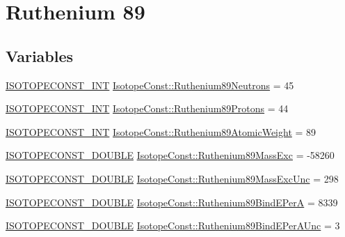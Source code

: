\hypertarget{group___isotope_const-_ruthenium-_ru89}{}\section{Ruthenium 89}
\label{group___isotope_const-_ruthenium-_ru89}
\subsection*{Variables}
\begin{DoxyCompactItemize}
\item 
\mbox{\hyperlink{group___isotope_const-_macros_ga5f18360b3e99483a35c32d789e62621c}{I\+S\+O\+T\+O\+P\+E\+C\+O\+N\+S\+T\+\_\+\+I\+NT}} \mbox{\hyperlink{group___isotope_const-_ruthenium-_ru89_ga52a7685e8abb6c1b7d7dfacb1fcd1abc}{Isotope\+Const\+::\+Ruthenium89\+Neutrons}} = 45
\item 
\mbox{\hyperlink{group___isotope_const-_macros_ga5f18360b3e99483a35c32d789e62621c}{I\+S\+O\+T\+O\+P\+E\+C\+O\+N\+S\+T\+\_\+\+I\+NT}} \mbox{\hyperlink{group___isotope_const-_ruthenium-_ru89_gaef5ae25256e875dc4ad3ab60cf710efb}{Isotope\+Const\+::\+Ruthenium89\+Protons}} = 44
\item 
\mbox{\hyperlink{group___isotope_const-_macros_ga5f18360b3e99483a35c32d789e62621c}{I\+S\+O\+T\+O\+P\+E\+C\+O\+N\+S\+T\+\_\+\+I\+NT}} \mbox{\hyperlink{group___isotope_const-_ruthenium-_ru89_gad777b961c2061da26df13c1b0f1cac62}{Isotope\+Const\+::\+Ruthenium89\+Atomic\+Weight}} = 89
\item 
\mbox{\hyperlink{group___isotope_const-_macros_ga8f45a7272ce02c0b4c65c44636ed719a}{I\+S\+O\+T\+O\+P\+E\+C\+O\+N\+S\+T\+\_\+\+D\+O\+U\+B\+LE}} \mbox{\hyperlink{group___isotope_const-_ruthenium-_ru89_ga822f599610e9cb2a6e105e4e0cd92e9e}{Isotope\+Const\+::\+Ruthenium89\+Mass\+Exc}} = -\/58260
\item 
\mbox{\hyperlink{group___isotope_const-_macros_ga8f45a7272ce02c0b4c65c44636ed719a}{I\+S\+O\+T\+O\+P\+E\+C\+O\+N\+S\+T\+\_\+\+D\+O\+U\+B\+LE}} \mbox{\hyperlink{group___isotope_const-_ruthenium-_ru89_ga6fbb70c9004f531d92b45e7b4c3d4de8}{Isotope\+Const\+::\+Ruthenium89\+Mass\+Exc\+Unc}} = 298
\item 
\mbox{\hyperlink{group___isotope_const-_macros_ga8f45a7272ce02c0b4c65c44636ed719a}{I\+S\+O\+T\+O\+P\+E\+C\+O\+N\+S\+T\+\_\+\+D\+O\+U\+B\+LE}} \mbox{\hyperlink{group___isotope_const-_ruthenium-_ru89_ga42bd938299e1b247a60743ed955b0fb0}{Isotope\+Const\+::\+Ruthenium89\+Bind\+E\+PerA}} = 8339
\item 
\mbox{\hyperlink{group___isotope_const-_macros_ga8f45a7272ce02c0b4c65c44636ed719a}{I\+S\+O\+T\+O\+P\+E\+C\+O\+N\+S\+T\+\_\+\+D\+O\+U\+B\+LE}} \mbox{\hyperlink{group___isotope_const-_ruthenium-_ru89_gad4267160bd776f059aaf279b14da9032}{Isotope\+Const\+::\+Ruthenium89\+Bind\+E\+Per\+A\+Unc}} = 3

\end{DoxyCompactItemize}
